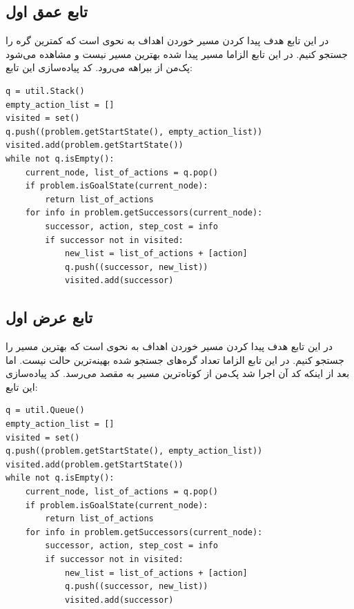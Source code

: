 \documentclass[11pt, a4paper, oneside]{book}
\begin{document}
	 \subsection{تابع عمق اول}
	 در این تابع هدف پیدا کردن مسیر خوردن اهداف به نحوی است که کمترین گره را جستجو کنیم. در این تابع الزاما مسیر پیدا شده بهترین مسیر نیست و مشاهده می‌شود پک‌من از بیراهه می‌رود. کد پیاده‌سازی این تابع:
	 \begin{LTR}
\begin{verbatim}
q = util.Stack()
empty_action_list = []
visited = set()
q.push((problem.getStartState(), empty_action_list))
visited.add(problem.getStartState())
while not q.isEmpty():
    current_node, list_of_actions = q.pop()
    if problem.isGoalState(current_node):
        return list_of_actions
    for info in problem.getSuccessors(current_node):
        successor, action, step_cost = info
        if successor not in visited:
            new_list = list_of_actions + [action]
            q.push((successor, new_list))
            visited.add(successor)
\end{verbatim}
	 \end{LTR}
	
		 \subsection{تابع عرض اول}
	در این تابع هدف پیدا کردن مسیر خوردن اهداف به نحوی است که بهترین مسیر را جستجو کنیم. در این تابع الزاما تعداد گره‌های جستجو شده بهینه‌ترین حالت نیست. اما بعد از اینکه کد آن اجرا شد پک‌من از کوتاه‌ترین مسیر به مقصد می‌رسد. کد پیاده‌سازی این تابع:
	\begin{LTR}
		\begin{verbatim}
q = util.Queue()
empty_action_list = []
visited = set()
q.push((problem.getStartState(), empty_action_list))
visited.add(problem.getStartState())
while not q.isEmpty():
    current_node, list_of_actions = q.pop()
    if problem.isGoalState(current_node):
        return list_of_actions
    for info in problem.getSuccessors(current_node):
        successor, action, step_cost = info
        if successor not in visited:
            new_list = list_of_actions + [action]
            q.push((successor, new_list))
            visited.add(successor)
		\end{verbatim}
	\end{LTR}
	
	
\end{document}
